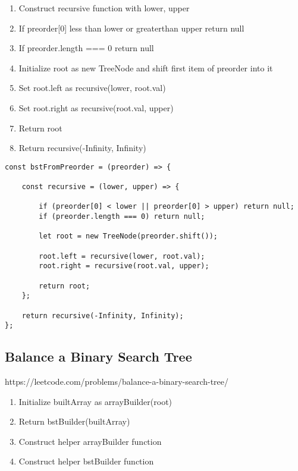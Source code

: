 \documentclass[10pt]{article}
\begin{document}
\begin{enumerate}
	\item Construct recursive function with lower, upper 
	\item If preorder[0] less than lower or greaterthan upper return null
	\item If preorder.length === 0 return null 
	\item Initialize root as new TreeNode and shift first item of preorder into it
	\item Set root.left as recursive(lower, root.val)
	\item Set root.right as recursive(root.val, upper)
	\item Return root
	\item Return recursive(-Infinity, Infinity)
\end{enumerate}

\begin{lstlisting}[title=Solution bstFromPreorder, captionpos=t]
const bstFromPreorder = (preorder) => {
    
    const recursive = (lower, upper) => {
        
        if (preorder[0] < lower || preorder[0] > upper) return null;
        if (preorder.length === 0) return null; 
        
        let root = new TreeNode(preorder.shift());
        
        root.left = recursive(lower, root.val);
        root.right = recursive(root.val, upper);
        
        return root;
    };

    return recursive(-Infinity, Infinity);
};
\end{lstlisting}
\medskip %





















\pagebreak
\medskip   
\subsection {Balance a Binary Search Tree}
https://leetcode.com/problems/balance-a-binary-search-tree/

\begin{enumerate}
	\item Initialize builtArray as arrayBuilder(root)
	\item Return bstBuilder(builtArray)
	\item Construct helper arrayBuilder function 
	\item Construct helper bstBuilder function
\end{enumerate}
\end{document}
